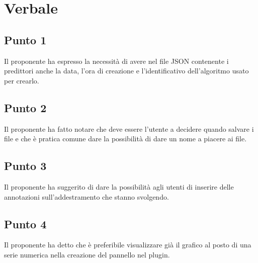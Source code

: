 \section{Verbale}
    \subsection{Punto 1}
        Il proponente ha espresso la necessità di avere nel file JSON contenente i predittori anche la data, l'ora di creazione e l'identificativo dell'algoritmo usato per crearlo.
    \subsection{Punto 2}
        Il proponente ha fatto notare che deve essere l'utente a decidere quando salvare i file e che è pratica comune dare la possibilità di dare un nome a piacere ai file.
    \subsection{Punto 3}
        Il proponente ha suggerito di dare la possibilità agli utenti di inserire delle annotazioni sull'addestramento che stanno svolgendo.
    \subsection{Punto 4}
        Il proponente ha detto che è preferibile visualizzare già il grafico al posto di una serie numerica nella creazione del pannello nel plugin. 
     
        